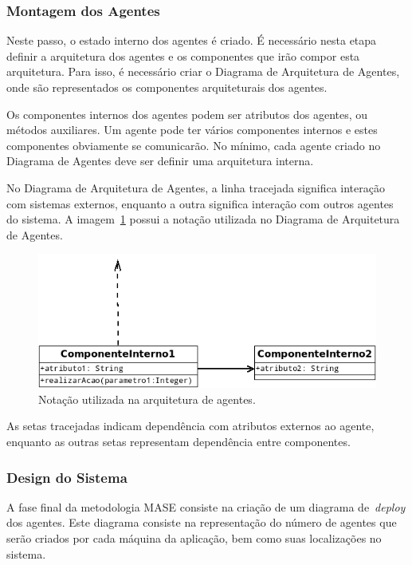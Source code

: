 \subsubsection{Montagem dos Agentes}

Neste passo, o estado interno dos agentes é criado. É necessário nesta etapa definir a arquitetura dos agentes e os componentes que irão compor esta arquitetura. Para isso, é necessário criar o Diagrama de Arquitetura de Agentes, onde são representados os componentes arquiteturais dos agentes.

Os componentes internos dos agentes podem ser atributos dos agentes, ou métodos auxiliares. Um agente pode ter vários componentes internos e estes componentes obviamente se comunicarão. No mínimo, cada agente criado no Diagrama de Agentes deve ser definir uma arquitetura interna.

No Diagrama de Arquitetura de Agentes, a linha tracejada significa interação com sistemas externos, enquanto a outra significa interação com outros agentes do sistema. A imagem~\ref{fig:exemplo-diagrama-arquitetura-agentes} possui a notação utilizada no Diagrama de Arquitetura de Agentes.

\begin{figure}
	\centering
	\includegraphics[scale=0.65]{images/exemplo-diagrama-arquitetura-agentes.png}
	\caption{Notação utilizada na arquitetura de agentes.}
	\label{fig:exemplo-diagrama-arquitetura-agentes}
\end{figure}

As setas tracejadas indicam dependência com atributos externos ao agente, enquanto as outras setas representam dependência entre componentes.

\subsubsection{Design do Sistema}

A fase final da metodologia MASE consiste na criação de um diagrama de~\emph{deploy} dos agentes. Este diagrama consiste na representação do número de agentes que serão criados por cada máquina da aplicação, bem como suas localizações no sistema.

